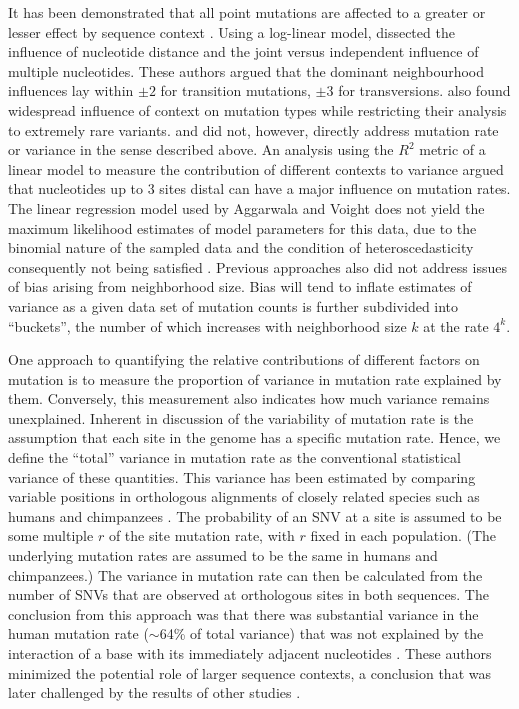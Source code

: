 It has been demonstrated that all point mutations are affected to a greater or lesser effect by sequence context \citep{Zhu_2016}. Using a log-linear model, \citet{Zhu_2016} dissected the influence of nucleotide distance and the joint versus independent influence of multiple nucleotides. These authors argued that the dominant neighbourhood influences lay within $\pm2$ for transition mutations, $\pm3$ for transversions. \citet{carlson2018extremely} also found widespread influence of context on mutation types while restricting their analysis to extremely rare variants. \citet{Zhu_2016} and \citet{carlson2018extremely} did not, however, directly address mutation rate or variance in the sense described above.  An analysis using the $R^2$ metric of a linear model to measure the contribution of different contexts to variance \citep{Aggarwala2016} argued that nucleotides up to 3 sites distal can have a major influence on mutation rates. The linear regression model used by Aggarwala and Voight does not yield the maximum likelihood estimates of model parameters for this data, due to the binomial nature of the sampled data and the condition of heteroscedasticity consequently not being satisfied \citep[][p. 120]{agresti}. Previous approaches also did not address issues of bias arising from neighborhood size. Bias will tend to inflate estimates of variance as a given data set of mutation counts is further subdivided into ``buckets'', the number of which increases with neighborhood size $k$ at the rate $4^k$.

One approach to quantifying the relative contributions of different factors on mutation is to measure the proportion of variance in mutation rate explained by them. Conversely, this measurement also indicates how much variance remains unexplained. Inherent in discussion of the variability of mutation rate is the assumption that each site in the genome has a specific mutation rate. Hence, we define the ``total'' variance in mutation rate as the conventional statistical variance of these quantities. This variance has been estimated by comparing variable positions in orthologous alignments of closely related species such as humans and chimpanzees \citep{Hodgkinson2009}. The probability of an SNV at a site is assumed to be some multiple $r$ of the site mutation rate, with $r$ fixed in each population. (The underlying mutation rates are assumed to be the same in humans and chimpanzees.) The variance in mutation rate can then be calculated from the number of SNVs that are observed at orthologous sites in both sequences. The conclusion from this approach was that there was substantial variance in the human mutation rate ($\sim$64\% of total variance) that was not explained by the interaction of a base with its immediately adjacent nucleotides \citep{Hodgkinson2009}. These authors minimized the potential role of larger sequence contexts, a conclusion that was later challenged by the results of other studies \citep{Aggarwala2016, Zhu_2016}.

